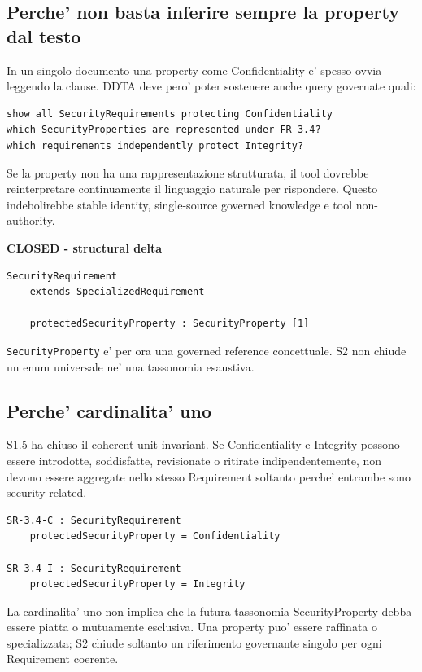 \documentclass[11pt,a4paper]{article}
\newcommand{\closed}{\textbf{CLOSED}}
\newenvironment{resultbox}[1]{%
  \def\FrameCommand{\fcolorbox{ddtagreen}{ddtagray}}%
  \MakeFramed{\advance\hsize-2\width\FrameRestore}
  \noindent\textbf{#1}\par\smallskip
}{\endMakeFramed}
\begin{document}
\subsection{Perche' non basta inferire sempre la property dal testo}

In un singolo documento una property come Confidentiality e' spesso ovvia leggendo la clause. DDTA deve pero' poter sostenere anche query governate quali:

\begin{lstlisting}
show all SecurityRequirements protecting Confidentiality
which SecurityProperties are represented under FR-3.4?
which requirements independently protect Integrity?
\end{lstlisting}

Se la property non ha una rappresentazione strutturata, il tool dovrebbe reinterpretare continuamente il linguaggio naturale per rispondere. Questo indebolirebbe stable identity, single-source governed knowledge e tool non-authority.

\begin{resultbox}{\closed{} - structural delta}
\begin{lstlisting}
SecurityRequirement
    extends SpecializedRequirement

    protectedSecurityProperty : SecurityProperty [1]
\end{lstlisting}
\end{resultbox}

\texttt{SecurityProperty} e' per ora una governed reference concettuale. S2 non chiude un enum universale ne' una tassonomia esaustiva.

\subsection{Perche' cardinalita' uno}

S1.5 ha chiuso il coherent-unit invariant. Se Confidentiality e Integrity possono essere introdotte, soddisfatte, revisionate o ritirate indipendentemente, non devono essere aggregate nello stesso Requirement soltanto perche' entrambe sono security-related.

\begin{lstlisting}
SR-3.4-C : SecurityRequirement
    protectedSecurityProperty = Confidentiality

SR-3.4-I : SecurityRequirement
    protectedSecurityProperty = Integrity
\end{lstlisting}

La cardinalita' uno non implica che la futura tassonomia SecurityProperty debba essere piatta o mutuamente esclusiva. Una property puo' essere raffinata o specializzata; S2 chiude soltanto un riferimento governante singolo per ogni Requirement coerente.
\end{document}
